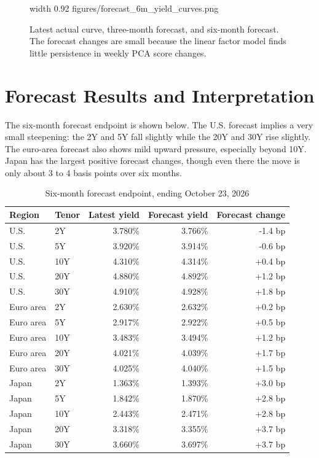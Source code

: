 \documentclass[11pt]{article}
\newcommand{\img}[2]{\pdfximage width #1 {#2}\pdfrefximage\pdflastximage}
\begin{document}
\begin{figure}[htbp]
\centering
\img{0.92\linewidth}{figures/forecast_6m_yield_curves.png}
\caption{Latest actual curve, three-month forecast, and six-month forecast. The forecast changes are small because the linear factor model finds little persistence in weekly PCA score changes.}
\end{figure}

\section{Forecast Results and Interpretation}

The six-month forecast endpoint is shown below. The U.S. forecast implies a very small steepening: the 2Y and 5Y fall slightly while the 20Y and 30Y rise slightly. The euro-area forecast also shows mild upward pressure, especially beyond 10Y. Japan has the largest positive forecast changes, though even there the move is only about 3 to 4 basis points over six months.

\begin{table}[htbp]
\centering
\caption{Six-month forecast endpoint, ending October 23, 2026}
\small
\begin{tabular}{llrrr}
\toprule
Region & Tenor & Latest yield & Forecast yield & Forecast change \\
\midrule
U.S. & 2Y & 3.780\% & 3.766\% & -1.4 bp \\
U.S. & 5Y & 3.920\% & 3.914\% & -0.6 bp \\
U.S. & 10Y & 4.310\% & 4.314\% & +0.4 bp \\
U.S. & 20Y & 4.880\% & 4.892\% & +1.2 bp \\
U.S. & 30Y & 4.910\% & 4.928\% & +1.8 bp \\
Euro area & 2Y & 2.630\% & 2.632\% & +0.2 bp \\
Euro area & 5Y & 2.917\% & 2.922\% & +0.5 bp \\
Euro area & 10Y & 3.483\% & 3.494\% & +1.2 bp \\
Euro area & 20Y & 4.021\% & 4.039\% & +1.7 bp \\
Euro area & 30Y & 4.025\% & 4.040\% & +1.5 bp \\
Japan & 2Y & 1.363\% & 1.393\% & +3.0 bp \\
Japan & 5Y & 1.842\% & 1.870\% & +2.8 bp \\
Japan & 10Y & 2.443\% & 2.471\% & +2.8 bp \\
Japan & 20Y & 3.318\% & 3.355\% & +3.7 bp \\
Japan & 30Y & 3.660\% & 3.697\% & +3.7 bp \\
\bottomrule
\end{tabular}
\end{table}
\end{document}
